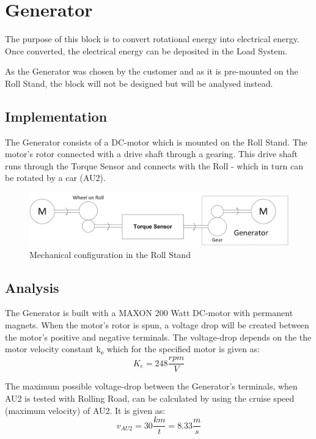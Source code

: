 \newpage
\section{Generator}
The purpose of this block is to convert rotational energy into electrical energy. Once converted, the electrical energy can be deposited in the Load System.

As the Generator was chosen by the customer and as it is pre-mounted on the Roll Stand, the block will not be designed but will be analysed instead.

\subsection{Implementation}
The Generator consists of a DC-motor which is mounted on the Roll Stand. The motor's rotor connected with a drive shaft through a gearing. This drive shaft runs through the Torque Sensor and connects with the Roll - which in turn can be rotated by a car (AU2).

\begin{figure}[H]
	\centering
	\includegraphics[width=1\linewidth]{Hardware/Pictures/Mechanical_Connections}
	\caption{Mechanical configuration in the Roll Stand}
	\label{fig:Generator_Implementation}
\end{figure}

\subsection{Analysis}
The Generator is built with a MAXON 200 Watt DC-motor with permanent magnets. When the motor's rotor is spun, a voltage drop will be created between the motor's positive and negative terminals. The voltage-drop depends on the the motor velocity constant k\textsubscript{e} which for the specified motor is given as:
\begin{equation}
	K_e = 248 \frac{rpm}{V}
\end{equation}

The maximum possible voltage-drop between the Generator's terminals, when AU2 is tested with Rolling Road, can be calculated by using the cruise speed (maximum velocity) of AU2. It is given as:
\begin{equation}
	v_{AU2} = 30 \frac{km}{t} = 8.33 \frac{m}{s}
\end{equation}

